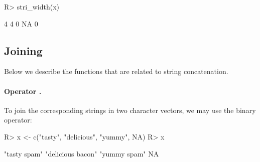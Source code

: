 \documentclass[nojss]{jss}
\begin{document}
\begin{Schunk}
\begin{Sinput}
R> stri_width(x)
\end{Sinput}
\begin{Soutput}
[1]  4  4  0 NA  0
\end{Soutput}
\end{Schunk}

\noindent





%
%
%









\subsection{Joining}

Below we describe the functions that are related to string concatenation.


\paragraph{Operator .}
To join  the corresponding strings in two character vectors,
we may use the binary  operator:

\begin{Schunk}
\begin{Sinput}
R> x <- c("tasty", "delicious", "yummy", NA)
R> x %s+% " " %s+% c("spam", "bacon")
\end{Sinput}
\begin{Soutput}
[1] "tasty spam"      "delicious bacon" "yummy spam"      NA
\end{Soutput}
\end{Schunk}
\end{document}
